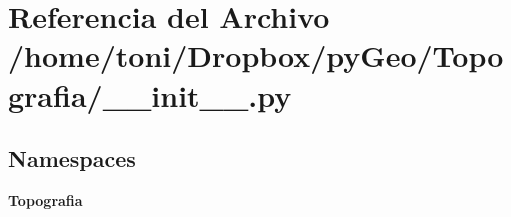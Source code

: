 \section{Referencia del Archivo /home/toni/\-Dropbox/py\-Geo/\-Topografia/\-\_\-\-\_\-init\-\_\-\-\_\-.py}
\label{Topografia_2____init_____8py}
\subsection*{Namespaces}
\begin{DoxyCompactItemize}
\item 
{\bf Topografia}
\end{DoxyCompactItemize}
